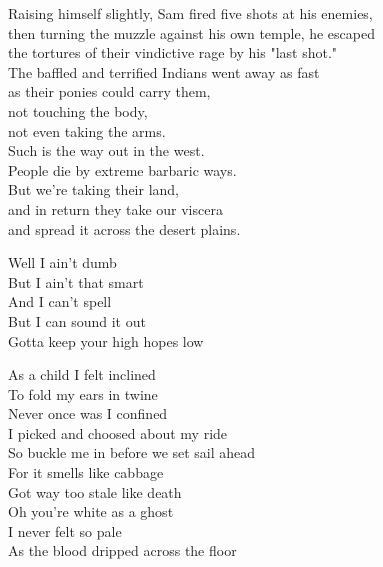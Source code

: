 Raising himself slightly, Sam fired five shots at his enemies,\\
then turning the muzzle against his own temple, he escaped\\
the tortures of their vindictive rage by his "last shot."\\
The baffled and terrified Indians went away as fast\\
as their ponies could carry them,\\
not touching the body,\\
not even taking the arms.\\

Such is the way out in the west.\\
People die by extreme barbaric ways.\\
But we're taking their land,\\
and in return they take our viscera\\
and spread it across the desert plains.\\




Well I ain't dumb\\
But I ain't that smart\\
And I can't spell\\
But I can sound it out\\

Gotta keep your high hopes low\\




As a child I felt inclined\\
To fold my ears in twine\\
Never once was I confined\\
I picked and choosed about my ride\\
So buckle me in before we set sail ahead\\
For it smells like cabbage\\
Got way too stale like death\\

Oh you're white as a ghost\\
I never felt so pale\\
As the blood dripped across the floor\\

